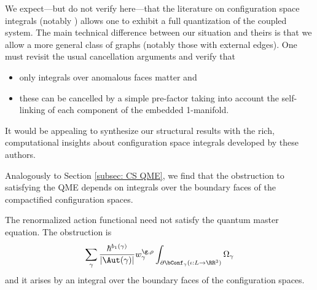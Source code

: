 \documentclass[10pt]{amsart}
\begin{document}
\begin{rmk}
We expect---but do not verify here---that the literature on configuration space integrals
(notably \cite{BotTau,Thu, AltFreVCS, CatCotLon1, KMV})
allows one to exhibit a full quantization of the coupled system.
The main technical difference between our situation and theirs is that we allow a more general class of graphs (notably those with external edges).
One must revisit the usual cancellation arguments and verify that 
\begin{itemize}
\item only integrals over anomalous faces matter and
\item these can be cancelled by a simple pre-factor taking into account the self-linking of each component of the embedded 1-manifold.
\end{itemize}
It would be appealing to synthesize our structural results with the rich, computational insights about configuration space integrals developed by these authors.
\end{rmk}

Analogously to Section \ref{subsec: CS QME}, 
we find that the obstruction to satisfying the QME depends on integrals over the boundary faces of the compactified configuration spaces.

\begin{lmm}\label{lmm: QME fails}
The renormalized action functional need not satisfy the quantum master equation.
The obstruction is  
\[
\sum_{\gamma} \frac{\hbar^{b_1(\gamma)}}{|\Aut(\gamma)|} w_\gamma^{\g,\rho} \int_{\partial \bConf_{\gamma}(\iota: L \to \RR^3)} \Omega_\gamma
\]
and it arises by an integral over the boundary faces of the configuration spaces.
\end{lmm}
\end{document}
